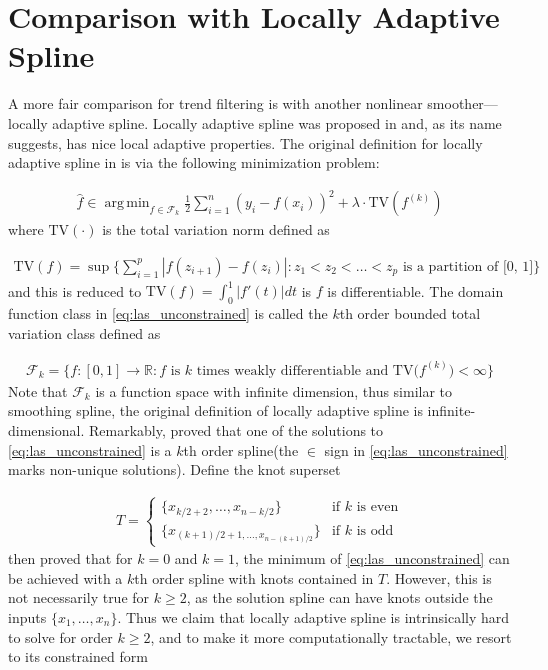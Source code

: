 \documentclass[a4paper]{article}
\DeclareMathOperator*{\argmin}{arg\,min}
\newcommand{\RR}{\mathbb{R}}
\renewcommand{\cal}{\mathcal}
\begin{document}
\section{Comparison with Locally Adaptive Spline}
\label{sec:las_compare}

A more fair comparison for trend filtering is with another nonlinear smoother---locally adaptive spline. Locally adaptive spline was proposed in \cite{mammen1997locally} and, as its name suggests, has nice local adaptive properties. The original definition for locally adaptive spline in \cite{mammen1997locally} is via the following minimization problem:

\begin{align}
\hat{f} \in \argmin_{f\in\cal{F}_k} \frac{1}{2}\sum_{i=1}^n (y_i - f(x_i))^2 + \lambda\cdot\text{TV}(f^{(k)})
\label{eq:las_unconstrained}
\end{align}
where $\text{TV}(\cdot)$ is the total variation norm defined as 

\begin{align*}
\text{TV}(f) = \sup\{\sum_{i=1}^p |f(z_{i+1}) - f(z_i)|:z_1<z_2<\ldots<z_p \text{ is a partition of [0, 1]}\}
\end{align*}
and this is reduced to $\text{TV}(f) = \int_0^1|f'(t)|dt$ is $f$ is differentiable. The domain function class in \eqref{eq:las_unconstrained} is called the $k$th order bounded total variation class defined as 

\begin{align*}
\cal{F}_k = \{f:[0, 1]\rightarrow\RR: f \text{ is $k$ times weakly differentiable and TV($f^{(k)}$)$<\infty$}\}
\end{align*}
Note that $\cal{F}_k$ is a function space with infinite dimension, thus similar to smoothing spline, the original definition of locally adaptive spline is infinite-dimensional. Remarkably, \cite{mammen1997locally} proved that one of the solutions to \eqref{eq:las_unconstrained} is a $k$th order spline(the $\in$ sign in \eqref{eq:las_unconstrained} marks non-unique solutions). Define the knot superset

\begin{align}
T = 
\begin{cases}
\{x_{k/2+2}, \ldots, x_{n-k/2}\} & \text{if $k$ is even}\\
\{x_{(k+1)/2+1, \ldots, x_{n-(k+1)/2}}\} & \text{if $k$ is odd}
\end{cases}
\label{eq:knotT}
\end{align}
then \cite{mammen1997locally} proved that for $k = 0$ and $k = 1$, the minimum of \eqref{eq:las_unconstrained} can be achieved with a $k$th order spline with knots contained in $T$. However, this is not necessarily true for $k\geq 2$, as the solution spline can have knots outside the inputs $\{x_1,\ldots, x_n\}$. Thus we claim that locally adaptive spline is intrinsically hard to solve for order $k\geq 2$, and to make it more computationally tractable, we resort to its constrained form
\end{document}
